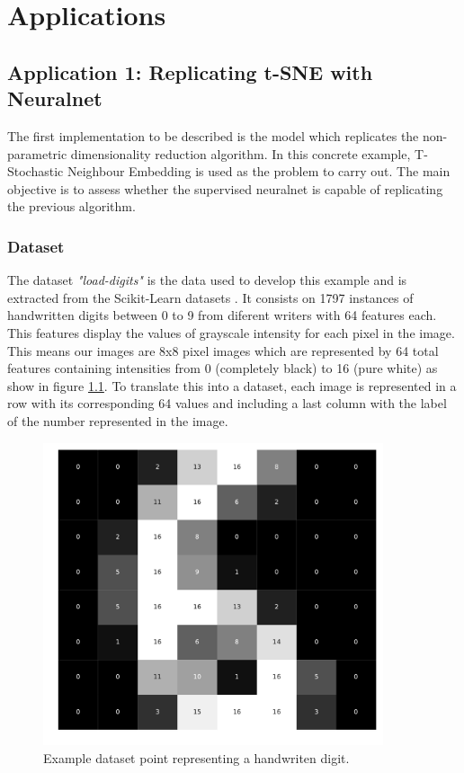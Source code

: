\documentclass[a4paper,11pt,spanish]{report}
\begin{document}

\chapter{Applications}
\label{chap:app}

\section{Application 1: Replicating t-SNE with Neuralnet}
\label{sec:app1}

The first implementation to be described is the model which replicates the non-parametric dimensionality reduction algorithm. In this concrete example, T-Stochastic Neighbour Embedding is used as the problem to carry out. The main objective is to assess whether the supervised neuralnet is capable of replicating the previous algorithm.

\subsection{Dataset}
\label{ssec:data1}

The dataset \textit{"load-digits"} is the data used to develop this example and is extracted from the Scikit-Learn datasets \citep{scikit-learn}. It consists on 1797 instances of handwritten digits between 0 to 9 from diferent writers with 64 features each. This features display the values of grayscale intensity for each pixel in the image. This means our images are 8x8 pixel images which are represented by 64 total features containing intensities from 0 (completely black) to 16 (pure white) as show in figure \ref{figuredigit}. To translate this into a dataset, each image is represented in a row with its corresponding 64 values and including a last column with the label of the number represented in the image.
\begin{figure}[h]
\centering
\includegraphics[width=10cm]{figures/exampledigit.pdf}
\caption{\label{figuredigit}Example dataset point representing a handwriten digit.}
\end{figure}
\end{document}

